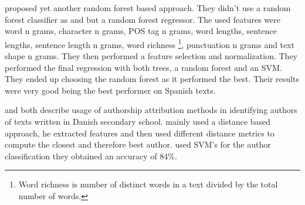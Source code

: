 \cite{bartoli2015b} proposed yet another random forest based approach. They
didn't use a random forest classifier as \cite{maitra2015} and
\cite{pacheco2015} but a random forest regressor. The used features were word n
grams, character n grams, POS tag n grams, word lengths, sentence lengths,
sentence length n grams, word richness \footnote{Word richness is number of
distinct words in a text divided by the total number of words.}, punctuation n
grams and text shape n grams. They then performed a feature selection and
normalization. They performed the final regression with both trees, a random
forest and an SVM. They ended up choosing the random forest as it performed the
best. Their results were very good being the best performer on Spanish texts.



\cite{hansen2014} and \cite{aalykke2016} both describe usage of authorship
attribution methods in identifying authors of texts written in Danish secondary
school. \cite{aalykke2016} mainly used a distance based approach, he extracted
features and then used different distance metrics to compute the closest and
therefore best author. \cite{hansen2014} used SVM's for the author
classification they obtained an accuracy of 84\%.
